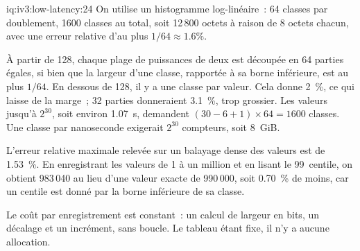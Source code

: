 \begin{solution}{iq:iv3:low-latency:24}
On utilise un histogramme log-linéaire~: 64 classes par doublement, 1600 classes au total, soit 12\,800 octets à raison de 8 octets chacun, avec une erreur relative d'au plus $1/64 \approx 1.6\%$.

À partir de 128, chaque plage de puissances de deux est découpée en 64 parties égales, si bien que la largeur d'une classe, rapportée à sa borne inférieure, est au plus $1/64$. En dessous de 128, il y a une classe par valeur. Cela donne 2~\%, ce qui laisse de la marge~; 32 parties donneraient 3.1~\%, trop grossier. Les valeurs jusqu'à $2^{30}$, soit environ 1.07~s, demandent $(30 - 6 + 1) \times 64 = 1600$ classes. Une classe par nanoseconde exigerait $2^{30}$ compteurs, soit 8~GiB.
\label{lst:iv3:ll:hist}

L'erreur relative maximale relevée sur un balayage dense des valeurs est de 1.53~\%. En enregistrant les valeurs de 1 à un million et en lisant le 99~centile, on obtient 983\,040 au lieu d'une valeur exacte de 990\,000, soit 0.70~\% de moins, car un centile est donné par la borne inférieure de sa classe.

Le coût par enregistrement est constant~: un calcul de largeur en bits, un décalage et un incrément, sans boucle. Le tableau étant fixe, il n'y a aucune allocation.

\end{solution}

